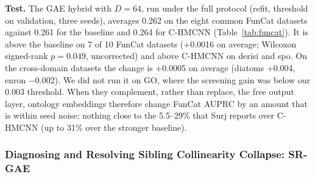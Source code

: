 \documentclass[preprint,12pt]{elsarticle}
\begin{document}
\textbf{Test.}  The GAE hybrid with $D{=}64$, run under the full
protocol (refit, threshold on validation, three seeds), averages 0.262
on the eight common FunCat datasets against 0.261 for the baseline and
0.264 for C-HMCNN (Table~\ref{tab:funcat}).  It is above the baseline on
7 of 10 FunCat datasets (+0.0016 on average; Wilcoxon signed-rank
$p=0.049$, uncorrected) and above C-HMCNN on derisi and spo.  On the
cross-domain datasets the change is +0.0005 on average (diatoms +0.004,
enron $-$0.002).  We did not run it on GO, where the screening gain was
below our 0.003 threshold.  When they complement, rather than replace, the
free output layer, ontology embeddings therefore change FunCat AUPRC by an
amount that is within seed noise; nothing close to the 5.5--29\% that Surj reports over
C-HMCNN (up to 31\% over the stronger baseline).

\subsubsection{Diagnosing and Resolving Sibling Collinearity Collapse: SR-GAE}
\label{sec:sr_gae}
\end{document}
